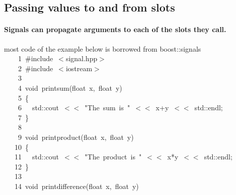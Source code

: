 \documentclass[9pt,onside,a4paper]{article}
\newcommand{\hlstd}[1]{\textcolor[rgb]{0.2,0,0.4}{#1}}
\newcommand{\hlstr}[1]{\textcolor[rgb]{0.09,0.38,0.65}{#1}}
\newcommand{\hlppc}[1]{\textcolor[rgb]{0.33,0.45,0.69}{#1}}
\newcommand{\hlopt}[1]{\textcolor[rgb]{0.33,0.33,0.33}{#1}}
\newcommand{\hllin}[1]{\textcolor[rgb]{0.6,0.6,0.6}{#1}}
\newcommand{\hlkwb}[1]{\textcolor[rgb]{0.96,0.55,0.14}{#1}}
\newcommand{\hlkwd}[1]{\textcolor[rgb]{0.82,0.11,0.93}{#1}}
\begin{document}
\subsection{Passing values to and from slots}

\paragraph{Signals can propagate arguments to each of the slots they call.\\}
most code of the example below is borrowed from boost::signals \\

\noindent
\ttfamily
\hlstd{}\hllin{\ \ \ \ 1\ }\hlppc{\#include\ $<$signal.hpp$>$}\\
\hllin{\ \ \ \ 2\ }\hlstd{}\hlppc{\#include\ $<$iostream$>$}\\
\hllin{\ \ \ \ 3\ }\hlstd{}\\
\hllin{\ \ \ \ 4\ }\hlkwb{void\ }\hlstd{}\hlkwd{print\textunderscore sum}\hlstd{}\hlopt{(}\hlstd{}\hlkwb{float\ }\hlstd{x}\hlopt{,\ }\hlstd{}\hlkwb{float\ }\hlstd{y}\hlopt{)}\\
\hllin{\ \ \ \ 5\ }\hlstd{}\hlopt{\{}\\
\hllin{\ \ \ \ 6\ }\hlstd{}\hlstd{\ \ }\hlstd{std}\hlopt{::}\hlstd{cout\ }\hlopt{$<$$<$\ }\hlstd{}\hlstr{"The\ sum\ is\ "}\hlstd{\ }\hlopt{$<$$<$\ }\hlstd{x}\hlopt{+}\hlstd{y\ }\hlopt{$<$$<$\ }\hlstd{std}\hlopt{::}\hlstd{endl}\hlopt{;}\\
\hllin{\ \ \ \ 7\ }\hlstd{}\hlopt{\}}\\
\hllin{\ \ \ \ 8\ }\hlstd{}\\
\hllin{\ \ \ \ 9\ }\hlkwb{void\ }\hlstd{}\hlkwd{print\textunderscore product}\hlstd{}\hlopt{(}\hlstd{}\hlkwb{float\ }\hlstd{x}\hlopt{,\ }\hlstd{}\hlkwb{float\ }\hlstd{y}\hlopt{)}\\
\hllin{\ \ \ 10\ }\hlstd{}\hlopt{\{}\\
\hllin{\ \ \ 11\ }\hlstd{}\hlstd{\ \ }\hlstd{std}\hlopt{::}\hlstd{cout\ }\hlopt{$<$$<$\ }\hlstd{}\hlstr{"The\ product\ is\ "}\hlstd{\ }\hlopt{$<$$<$\ }\hlstd{x}\hlopt{{*}}\hlstd{y\ }\hlopt{$<$$<$\ }\hlstd{std}\hlopt{::}\hlstd{endl}\hlopt{;}\\
\hllin{\ \ \ 12\ }\hlstd{}\hlopt{\}}\\
\hllin{\ \ \ 13\ }\hlstd{}\\
\hllin{\ \ \ 14\ }\hlkwb{void\ }\hlstd{}\hlkwd{print\textunderscore difference}\hlstd{}\hlopt{(}\hlstd{}\hlkwb{float\ }\hlstd{x}\hlopt{,\ }\hlstd{}\hlkwb{float\ }\hlstd{y}\hlopt{)}\\
\end{document}
